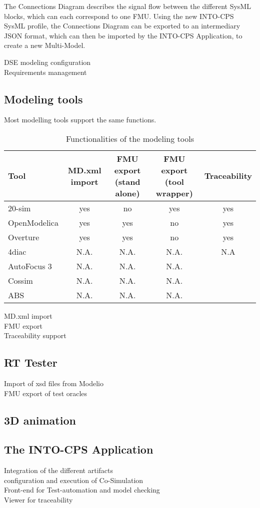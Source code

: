 The Connections Diagram describes the signal flow between the different SysML blocks, which can each correspond to one FMU. Using the new INTO-CPS SysML profile, the Connections Diagram can be exported to an intermediary JSON format, which can then be imported by the INTO-CPS Application, to create a new Multi-Model.

DSE modeling configuration\\
Requirements management\\

\subsection{Modeling tools}

Most modelling tools support the same functions.


\begin{table*}[ht]
	\centering
		\begin{tabular}{l|c|c|c|c}
			Tool & MD.xml import & FMU export (stand alone) & FMU export (tool wrapper) & Traceability\\
			\hline
			20-sim & yes & no & yes & yes\\
			OpenModelica & yes & yes & no & yes\\
			Overture & yes & yes & no & yes\\
			4diac & N.A. & N.A. & N.A. & N.A \\
			AutoFocus 3 & N.A. & N.A. & N.A. \\
			Cossim & N.A. & N.A. & N.A. \\
			ABS & N.A. & N.A. & N.A. \\
		\end{tabular}
	\caption{Functionalities of the modeling tools}
	\label{tab:FunctionalitiesOfTheModelingTools}
\end{table*}

MD.xml import\\
FMU export\\
Traceability support\\

\subsection{RT Tester}

Import of xsd files from Modelio\\
FMU export of test oracles \\

\subsection{3D animation}

\subsection{The INTO-CPS Application}

Integration of the different artifacts\\ 
configuration and execution of Co-Simulation\\
Front-end for Test-automation and model checking\\
Viewer for traceability\\
